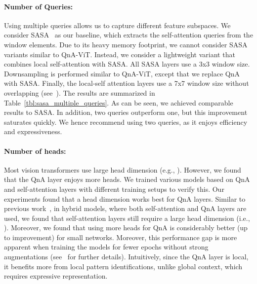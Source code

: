 \paragraph{Number of Queries:} Using multiple queries allows us to capture different feature subspaces. We consider SASA~\cite{SASA} as our baseline, which extracts the self-attention queries from the window elements. Due to its heavy memory footprint, we cannot consider SASA variants similar to QnA-ViT. Instead, we consider a lightweight variant that combines local self-attention with SASA. All SASA layers use a 3x3 window size. Downsampling is performed similar to QnA-ViT, except that we replace QnA with SASA. Finally, the local-self attention layers use a 7x7 window size without overlapping (see~). The results are summarized in Table~\ref{tbl:sasa_multiple_queries}. As can be seen, we achieved comparable results to SASA. In addition, two queries outperform one, but this improvement saturates quickly. We hence recommend using two queries, as it enjoys efficiency and expressiveness. 

\paragraph{Number of heads:} Most vision transformers use large head dimension (e.g., )\cite{CaiT}. However, we found that the QnA layer enjoys more heads. We trained various models based on QnA and self-attention layers with different training setups to verify this. Our experiments found that a head dimension  works best for QnA layers. Similar to previous work~\cite{CaiT}, in hybrid models, where both self-attention and QnA layers are used, we found that self-attention layers still require a large head dimension (i.e., ). Moreover, we found that using more heads for QnA is considerably better (up to  improvement) for small networks. Moreover, this performance gap is more apparent when training the models for fewer epochs without strong augmentations (see~ for further details). Intuitively, since the QnA layer is local, it benefits more from local pattern identifications, unlike global context, which requires expressive representation. 

